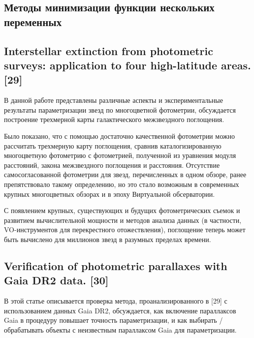 \documentclass[12pt, a4paper]{article}
\begin{document}
	\subsection*{Методы минимизации функции нескольких переменных}
	\subsection*{Interstellar extinction from photometric surveys: application to four high-latitude areas. [29]}
	В данной работе представлены различные аспекты и экспериментальные результаты параметризации звезд по многоцветной фотометрии, обсуждается построение трехмерной карты галактического межзвездного поглощения.

	Было показано, что с помощью достаточно качественной фотометрии можно рассчитать трехмерную карту поглощения, сравнив каталогизированную многоцветную фотометрию с фотометрией, полученной из уравнения модуля расстояний, закона межзвездного поглощения и расстояния. Отсутствие самосогласованной фотометрии для звезд, перечисленных в одном обзоре, ранее препятствовало такому определению, но это стало возможным в современных крупных многоцветных обзорах и в эпоху Виртуальной обсерватории.

	С появлением крупных, существующих и будущих фотометрических съемок и развитием вычислительной мощности и методов анализа данных (в частности, VO-инструментов для перекрестного отожествления), поглощение теперь может быть вычислено для миллионов звезд в разумных пределах времени.

	\subsection*{Verification of photometric parallaxes with Gaia DR2 data. [30]}
	В этой статье описывается проверка метода, проанализированного в [29] с использованием данных Gaia DR2, обсуждается, как включение параллаксов Gaia в процедуру повышает точность параметризации, и как выбирать / обрабатывать объекты с неизвестным параллаксом Gaia для параметризации.
\end{document}
